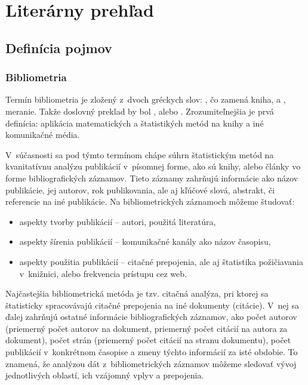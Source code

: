 \chapter{Literárny prehľad}
\setcounter{page}{1}

\section{Definícia pojmov}

\subsection{Bibliometria}

Termín bibliometria je zložený z~dvoch gréckych slov:
, čo zamená kniha, a
, meranie.  Takže doslovný
preklad by bol , alebo .
Zrozumiteľnejšia je prvá definícia: aplikácia matematických a štatistikých metód
na knihy a iné komunikačné média.  \citep{Pritchard1969}

V~súčasnosti sa pod týmto termínom chápe súhrn štatistickým metód na
kvanitatívnu analýzu publikácií v~písomnej forme, ako sú knihy, alebo články vo
forme bibliografických záznamov.  Tieto záznamy zahrňujú informácie ako názov
publikácie, jej autorov, rok publikovania, ale aj kľúčové slová, abstrakt, či
referencie na iné publikácie.  Na bibliometrických záznamoch môžeme študovať:

\begin{itemize}
\item aspekty tvorby publikácií -- autori, použitá literatúra,
\item aspekty šírenia publikácií -- komunikačné kanály ako názov časopisu,
\item aspekty použitia publikácií -- citačné prepojenia, ale aj štatistika
  požičiavania v~knižnici, alebo frekvencia prístupu cez web.
  \citep{Ondrisova2011}
\end{itemize}

Najčastejšia bibliometrická metóda je tzv.  citačná analýza, pri ktorej sa
štatisticky spracovávajú citačné prepojenia na iné dokumenty (citácie).  V~nej
sa ďalej zahrňujú ostatné informácie bibliografických záznamov, ako počet
autorov (priemerný počet autorov na dokument, priemerný počet citácií na autora
za dokument), počet strán (priemerný počet citácií na stranu dokumentu), počet
publikácií v~konkrétnom časopise a zmeny týchto informácií za isté obdobie.  To
znamená, že analýzou dát z~bibliometrických záznamov môžeme sledovať vývoj
jednotlivých oblastí, ich vzájomný vplyv a prepojenia.

